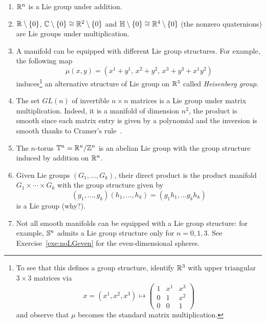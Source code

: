 \begin{example}
	\begin{enumerate}
		\item $\mathbb{R}^n$ is a Lie group under addition.
		\item $\mathbb{R}\setminus\{0\}$, $\mathbb{C}\setminus\{0\}\cong\mathbb{R}^2\setminus\{0\}$ and $\mathbb{H}\setminus\{0\}\cong\mathbb{R}^4\setminus\{0\}$ (the nonzero quaternions) are Lie groups under multiplication.
		\item A manifold can be equipped with different Lie group structures. For example, the following map
		      \begin{equation}
			      \mu(x,y) = (x^1+y^1,\, x^2+y^2,\, x^3+y^3+x^1y^2)
		      \end{equation}
		      induces\footnote{To see that this defines a group structure, identify $\mathbb{R}^3$ with upper triangular $3\times3$ matrices via
			      \begin{equation}\nonumber
				      x = (x^1, x^2, x^3) \mapsto \begin{pmatrix}
					      1 & x^1 & x^3 \\
					      0 & 1   & x^2 \\
					      0 & 0   & 1
				      \end{pmatrix}
			      \end{equation}
			      and observe that $\mu$ becomes the standard matrix multiplication.} an alternative structure of Lie group on $\mathbb{R}^3$ called \emph{Heisenberg group}.
		\item The set $GL(n)$ of invertible $n\times n$ matrices is a Lie group under matrix multiplication. Indeed, it is a manifold of dimension $n^2$, the product is smooth since each matrix entry is given by a polynomial and the inversion is smooth thanks to Cramer's rule~\cite[Proposition B.36]{book:lee}.
		\item The $n$-torus $\mathbb{T}^n = \mathbb{R}^n/\mathbb{Z}^n$ is an abelian Lie group with the group structure induced by addition on $\mathbb{R}^n$.
		\item Given Lie groups $(G_1, \ldots, G_k)$, their direct product is the product manifold $G_1\times \cdots\times G_k$ with the group structure given by
		      \begin{equation}
			      (g_1, \ldots, g_k)(h_1,\ldots,h_k) = (g_1h_1, \ldots g_kh_k)
		      \end{equation}
		      is a Lie group (why?).
		\item Not all smooth manifolds can be equipped with a Lie group structure: for example, $\mathbb{S}^n$ admits a Lie group structure only for $n=0,1,3$. See Exercise~\ref{exe:noLGeven} for the even-dimensional spheres.
	\end{enumerate}
\end{example}

